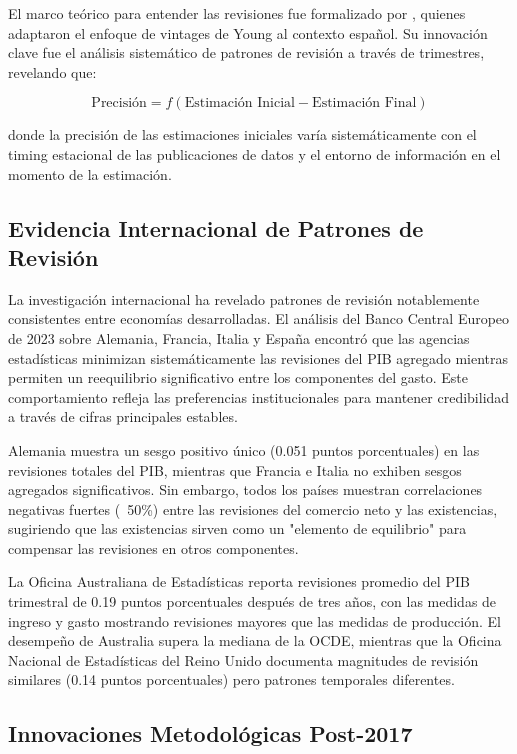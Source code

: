 \documentclass{article}
\begin{document}
El marco teórico para entender las revisiones fue formalizado por \citet{pavia2017}, quienes adaptaron el enfoque de vintages de Young al contexto español. Su innovación clave fue el análisis sistemático de patrones de revisión a través de trimestres, revelando que:

\begin{equation}
\text{Precisión} = f(\text{Estimación Inicial} - \text{Estimación Final})
\end{equation}

donde la precisión de las estimaciones iniciales varía sistemáticamente con el timing estacional de las publicaciones de datos y el entorno de información en el momento de la estimación.

\subsection{Evidencia Internacional de Patrones de Revisión}

La investigación internacional ha revelado patrones de revisión notablemente consistentes entre economías desarrolladas. El análisis del Banco Central Europeo de 2023 sobre Alemania, Francia, Italia y España encontró que las agencias estadísticas minimizan sistemáticamente las revisiones del PIB agregado mientras permiten un reequilibrio significativo entre los componentes del gasto. Este comportamiento refleja las preferencias institucionales para mantener credibilidad a través de cifras principales estables.

Alemania muestra un sesgo positivo único (0.051 puntos porcentuales) en las revisiones totales del PIB, mientras que Francia e Italia no exhiben sesgos agregados significativos. Sin embargo, todos los países muestran correlaciones negativas fuertes (~50\%) entre las revisiones del comercio neto y las existencias, sugiriendo que las existencias sirven como un "elemento de equilibrio" para compensar las revisiones en otros componentes.

La Oficina Australiana de Estadísticas reporta revisiones promedio del PIB trimestral de 0.19 puntos porcentuales después de tres años, con las medidas de ingreso y gasto mostrando revisiones mayores que las medidas de producción. El desempeño de Australia supera la mediana de la OCDE, mientras que la Oficina Nacional de Estadísticas del Reino Unido documenta magnitudes de revisión similares (0.14 puntos porcentuales) pero patrones temporales diferentes.

\subsection{Innovaciones Metodológicas Post-2017}
\end{document}
